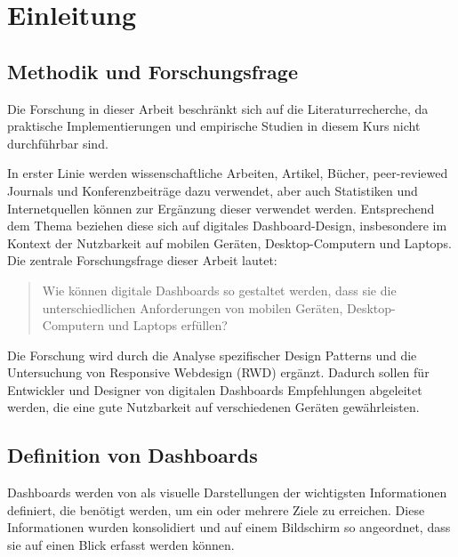 \section{Einleitung}


\subsection{Methodik und Forschungsfrage}

Die Forschung in dieser Arbeit beschränkt sich auf die Literaturrecherche, da praktische Implementierungen und empirische Studien in diesem Kurs nicht durchführbar sind.

In erster Linie werden wissenschaftliche Arbeiten, Artikel, Bücher, peer-reviewed Journals und Konferenzbeiträge dazu verwendet, aber auch Statistiken und Internetquellen können zur Ergänzung dieser verwendet werden.
Entsprechend dem Thema beziehen diese sich auf digitales Dashboard-Design, insbesondere im Kontext der Nutzbarkeit auf mobilen Geräten, Desktop-Computern und Laptops.
Die zentrale Forschungsfrage dieser Arbeit lautet:

\begin{quote}
    Wie können digitale Dashboards so gestaltet werden, dass sie die unterschiedlichen Anforderungen von mobilen Geräten, Desktop-Computern und Laptops erfüllen?
\end{quote}

Die Forschung wird durch die Analyse spezifischer Design Patterns und die Untersuchung von Responsive Webdesign (RWD) ergänzt.
Dadurch sollen für Entwickler und Designer von digitalen Dashboards Empfehlungen abgeleitet werden, die eine gute Nutzbarkeit auf verschiedenen Geräten gewährleisten.

\subsection{Definition von Dashboards}

Dashboards werden von \autocite{Few.InformationDashboardDesign.2013} als visuelle Darstellungen der wichtigsten Informationen definiert, die benötigt werden, um ein oder mehrere Ziele zu erreichen.
Diese Informationen wurden konsolidiert und auf einem Bildschirm so angeordnet, dass sie auf einen Blick erfasst werden können.


